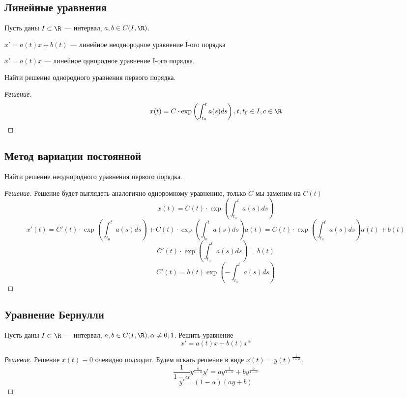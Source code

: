 \subsection{Линейные уравнения}
Пусть даны \(I \subset \R\) --- интервал, \(a, b \in C(I, \R)\).
\begin{definition}
    \(x' = a(t)x + b(t)\) --- линейное неоднородное уравнение I-ого порядка
\end{definition}
\begin{definition}
    \(x' = a(t)x\) --- линейное однородное уравнение I-ого порядка. 
\end{definition}

\begin{problem}
    Найти решение однородного уравнения первого порядка.
\end{problem}
\begin{proof}[Решение]
    \[x(t) = C \cdot \exp\left(\int_{t_0}^t a(s)ds\right), t, t_0 \in I, c \in \R\]
\end{proof}

\subsection{Метод вариации постоянной}
\begin{problem}
    Найти решение неоднородного уравнения первого порядка.
\end{problem}
\begin{proof}[Решение]
    Решение будет выглядеть аналогично одноромному уравнению, только \(C\) мы заменим на \(C(t)\)
    \[x(t) = C(t) \cdot \exp\left(\int_{t_0}^t a(s)ds\right)\]
    \[x'(t) = C'(t) \cdot \exp\left(\int_{t_0}^t a(s)ds\right) + C(t) \cdot \exp\left(\int_{t_0}^t a(s)ds\right)a(t) = C(t) \cdot \exp\left(\int_{t_0}^t a(s)ds\right)a(t) + b(t)\]
    \[C'(t) \cdot \exp\left(\int_{t_0}^t a(s)ds\right) = b(t)\]
    \[C'(t) = b(t)\exp\left(-\int_{t_0}^t a(s)ds\right)\]
\end{proof}

\subsection{Уравнение Бернулли}
\begin{problem}
    Пусть даны \(I \subset \R\) --- интервал, \(a, b \in C(I, \R), \alpha \ne 0, 1\). Решить уравнение
    \[x' = a(t)x + b(t)x^\alpha\]
\end{problem}
\begin{proof}[Решение]
    Решение \(x(t) \equiv 0\) очевидно подходит. Будем искать решение в виде \(x(t) = y(t)^{\frac{1}{1 - \alpha}}\).
    \[\frac{1}{1 - \alpha}y^{\frac{\alpha}{1 - \alpha}}y' = ay^{\frac{1}{1 - \alpha}} + by^{\frac{\alpha}{1 - \alpha}}\]
    \[y' = (1 - \alpha)(ay + b)\]
\end{proof}


